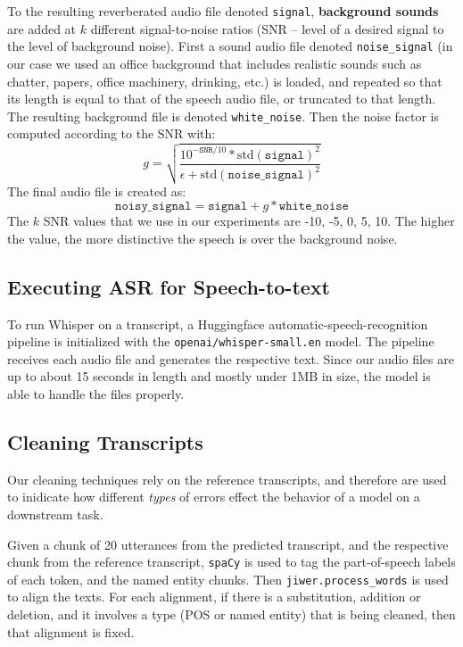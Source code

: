 To the resulting reverberated audio file denoted \texttt{signal}, \textbf{background sounds} are added at $k$ different signal-to-noise ratios (SNR -- level of a desired signal to the level of background noise). First a sound audio file \citep{myNoise2020office} denoted \texttt{noise\_signal} (in our case we used an office background that includes realistic sounds such as chatter, papers, office machinery, drinking, etc.) is loaded, and repeated so that its length is equal to that of the speech audio file, or truncated to that length. The resulting background file is denoted \texttt{white\_noise}. Then the noise factor is computed according to the SNR with:
\[
g = \sqrt{\frac{10^{-\texttt{SNR}/10} * \text{std}(\texttt{signal})^2}{\epsilon + \text{std}(\texttt{noise\_signal})^2}}
\]
The final audio file is created as:
\[
\texttt{noisy\_signal} = \texttt{signal} + g * \texttt{white\_noise}
\]
The $k$ SNR values that we use in our experiments are -10, -5, 0, 5, 10. The higher the value, the more distinctive the speech is over the background noise.


\subsection{Executing ASR for Speech-to-text}
\label{sec_appendix_implementation_stt}

To run Whisper on a transcript, a Huggingface \citep{wolf2020huggingfaces} automatic-speech-recognition pipeline is initialized with the \texttt{openai/whisper-small.en} model. The pipeline receives each audio file and generates the respective text. Since our audio files are up to about 15 seconds in length and mostly under 1MB in size, the model is able to handle the files properly.


\subsection{Cleaning Transcripts}
\label{sec_appendix_implementation_cleaning}

Our cleaning techniques rely on the reference transcripts, and therefore are used to inidicate how different \textit{types} of errors effect the behavior of a model on a downstream task.

Given a chunk of 20 utterances from the predicted transcript, and the respective chunk from the reference transcript, \texttt{spaCy} is used to tag the part-of-speech labels of each token, and the named entity chunks. Then \texttt{jiwer.process\_words} is used to align the texts. For each alignment, if there is a substitution, addition or deletion, and it involves a type (POS or named entity) that is being cleaned, then that alignment is fixed.

